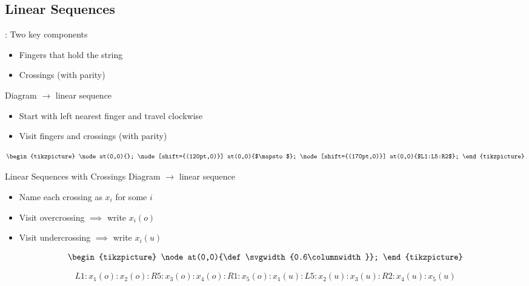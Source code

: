 \subsection{Linear Sequences}
\begin{frame}{\secname: \subsecname}
Two key components
\begin{itemize}[<+(1)->]
    \item Fingers that hold the string
    \item Crossings (with parity)
\end{itemize}

\pause Diagram $\to$ linear sequence

\begin{itemize}[<+(1)->]
    \item Start with left nearest finger and travel clockwise
    \item Visit fingers and crossings (with parity)
\end{itemize}

\def\svgwidth{0.6\columnwidth}
$$\begin{tikzpicture}
    \node at(0,0){};
    \node[shift={(120pt,0)}] at(0,0){$\mapsto$};
    \node[shift={(170pt,0)}] at(0,0){$L1:L5:R2$};
\end{tikzpicture}$$
\end{frame}


\begin{frame}{Linear Sequences with Crossings}
Diagram $\to$ linear sequence
\begin{itemize}[<+(1)->]
    \item Name each crossing as $x_i$ for some $i$
    \item Visit overcrossing $\implies$ write $x_i(o)$
    \item Visit undercrossing $\implies$ write $x_i(u)$
\end{itemize}

\pause
$$\begin{tikzpicture}
    \node at(0,0){\def\svgwidth{0.6\columnwidth}};
\end{tikzpicture}$$

$$
\scriptstyle
L1:x_1(o):x_2(o):R5:x_3(o):x_4(o):R1:x_5(o):x_1(u):L5:x_2(u):x_3(u):R2:x_4(u):x_5(u)
$$
\end{frame}

